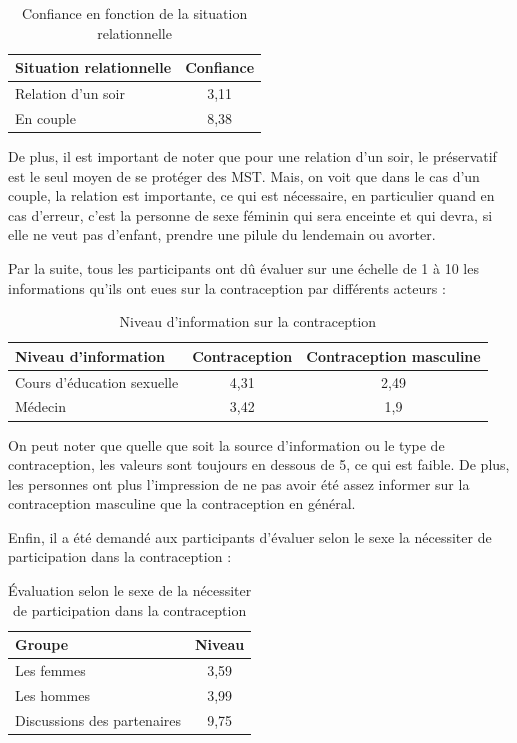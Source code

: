 \documentclass[12pt,a4paper]{report}
\begin{document}
\begin{table}[ht]
\centering
\begin{tabular}{|l|c|}
\hline
\textbf{Situation relationnelle} & \textbf{Confiance} \\
\hline
Relation d'un soir & 3,11 \\
En couple & 8,38 \\
\hline
\end{tabular}
\caption{Confiance en fonction de la situation relationnelle}
\end{table}

De plus, il est important de noter que pour une relation d'un soir, le préservatif est le seul moyen de se protéger des MST. Mais, on voit que dans le cas d'un couple, la relation est importante, ce qui est nécessaire, en particulier quand en cas d'erreur, c'est la personne de sexe féminin qui sera enceinte et qui devra, si elle ne veut pas d'enfant, prendre une pilule du lendemain ou avorter.

Par la suite, tous les participants ont dû évaluer sur une échelle de 1 à 10 les informations qu'ils ont eues sur la contraception par différents acteurs :

\begin{table}[ht]
\centering
\begin{tabular}{|l|c|c|}
\hline
Niveau d'information & \textbf{Contraception} & \textbf{Contraception masculine} \\
\hline
Cours d'éducation sexuelle & 4,31 & 2,49 \\
Médecin & 3,42 & 1,9 \\
\hline
\end{tabular}
\caption{Niveau d'information sur la contraception}
\end{table}

On peut noter que quelle que soit la source d'information ou le type de contraception, les valeurs sont toujours en dessous de 5, ce qui est faible. De plus, les personnes ont plus l'impression de ne pas avoir été assez informer sur la contraception masculine que la contraception en général.

Enfin, il a été demandé aux participants d'évaluer selon le sexe la nécessiter de participation dans la contraception :

\begin{table}[ht]
\centering
\begin{tabular}{|l|c|}
\hline
\textbf{Groupe} & \textbf{Niveau} \\
\hline
Les femmes & 3,59 \\
Les hommes & 3,99 \\
Discussions des partenaires & 9,75 \\
\hline
\end{tabular}
\caption{Évaluation selon le sexe de la nécessiter de participation dans la contraception}
\end{table}
\end{document}
